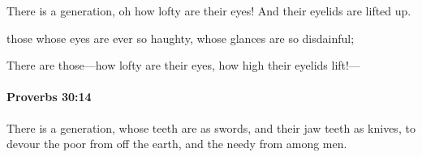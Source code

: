 			\begin{versebox}
					\item[BHS] 
					\item[ASV] There is a generation, oh how lofty are their eyes! And their eyelids are lifted up.
					\item[NIV] those whose eyes are ever so haughty, whose glances are so disdainful;
					\item[NRSV] There are those—how lofty are their eyes, how high their eyelids lift!—
			\end{versebox}

		\paragraph{Proverbs 30:14} %
			\label{PROVERBS-30-14}

			There is a generation, whose teeth are as swords, and their jaw teeth as knives, to devour the poor from off the earth, and the needy from among men.

